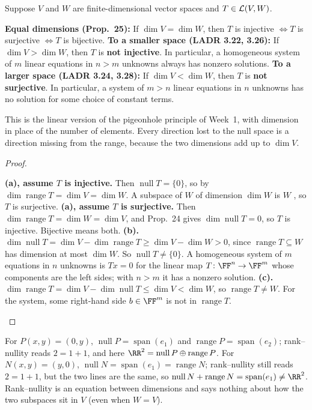 \documentclass[10pt]{scrartcl}
\DeclareMathOperator{\spn}{span}\DeclareMathOperator{\nul}{null}\DeclareMathOperator{\range}{range}
\begin{document}
\begin{proposition*}
  Suppose $V$ and $W$ are finite-dimensional vector spaces and $T\in\mathcal L(V,W)$.
  \begin{enumerate}[(a)]
    \ii \textbf{Equal dimensions (Prop.~25):} If $\dim V=\dim W$, then $T$ is injective $\iff T$ is surjective $\iff T$ is bijective.
    \ii \textbf{To a smaller space (LADR 3.22, 3.26):} If $\dim V>\dim W$, then $T$ is \textbf{not injective}. In particular, a homogeneous system of $m$ linear equations in $n>m$ unknowns always has nonzero solutions.
    \ii \textbf{To a larger space (LADR 3.24, 3.28):} If $\dim V<\dim W$, then $T$ is \textbf{not surjective}. In particular, a system of $m>n$ linear equations in $n$ unknowns has no solution for some choice of constant terms.
  \end{enumerate}
\end{proposition*}
\begin{ideabox}
  This is the linear version of the pigeonhole principle of Week~1, with dimension in place of the number of elements. Every direction lost to the null space is a direction missing from the range, because the two dimensions add up to $\dim V$.
\end{ideabox}
\begin{proof}
  \begin{steps}
    \ii \textbf{(a), assume $T$ is injective.} Then $\nul T=\{0\}$, so by  $\dim\range T=\dim V=\dim W$. A subspace of $W$ of dimension $\dim W$ is $W$ , so $T$ is surjective.
    \ii \textbf{(a), assume $T$ is surjective.} Then $\dim\range T=\dim W=\dim V$, and Prop.~24 gives $\dim\nul T=0$, so $T$ is injective. Bijective means both.
    \ii \textbf{(b).} $\dim\nul T=\dim V-\dim\range T\ge\dim V-\dim W>0$, since $\range T\subseteq W$ has dimension at most $\dim W$. So $\nul T\ne\{0\}$. A homogeneous system of $m$ equations in $n$ unknowns is $Tx=0$ for the linear map $T\colon\FF^n\to\FF^m$ whose components are the left sides; with $n>m$ it has a nonzero solution.
    \ii \textbf{(c).} $\dim\range T=\dim V-\dim\nul T\le\dim V<\dim W$, so $\range T\ne W$. For the system, some right-hand side $b\in\FF^m$ is not in $\range T$.
  \end{steps}
\end{proof}

\begin{example*}[$\RR^2=\nul P\oplus\range P$, but not for $N$]
  For $P(x,y)=(0,y)$, $\nul P=\spn(e_1)$ and $\range P=\spn(e_2)$; rank--nullity reads $2=1+1$, and here $\RR^2=\nul P\oplus\range P$. For $N(x,y)=(y,0)$, $\nul N=\spn(e_1)=\range N$; rank--nullity still reads $2=1+1$, but the two lines are the same, so $\nul N+\range N=\spn(e_1)\ne\RR^2$. Rank--nullity is an equation between dimensions and says nothing about how the two subspaces sit in $V$ (even when $W=V$).
\end{example*}
\end{document}
